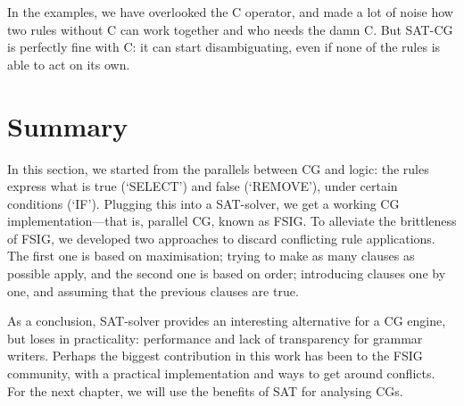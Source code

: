 In the examples, we have overlooked the C operator, and made a lot of noise how two rules without C can work together and who needs the damn C.
But SAT-CG is perfectly fine with C: it can start disambiguating, even if none of the rules is able to act on its own. 



\section{Summary}

In this section, we started from the parallels between CG and logic:
the rules express what is true (`SELECT') and false (`REMOVE'), under certain conditions (`IF').
Plugging this into a SAT-solver, we get a working CG implementation---that is, parallel CG, known as FSIG. 
To alleviate the brittleness of FSIG, we developed two approaches to discard conflicting rule applications.
The first one is based on maximisation; trying to make as many clauses as possible apply, and the second one is based on order; introducing clauses one by one, and assuming that the previous clauses are true.


As a conclusion, SAT-solver provides an interesting alternative for a CG engine, but loses in practicality: performance and lack of transparency for grammar writers.
Perhaps the biggest contribution in this work has been to the FSIG community, with a practical implementation and ways to get around conflicts.
For the next chapter, we will use the benefits of SAT for analysing CGs.






